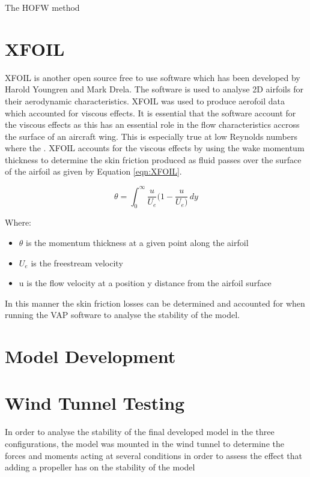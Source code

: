 The HOFW method


\section{XFOIL}
XFOIL is another open source free to use software which has been developed by Harold Youngren and Mark Drela. The software is used to analyse 2D airfoils for their aerodynamic characteristics. XFOIL was used to produce aerofoil data which accounted for viscous effects. It is essential that the software account for the viscous effects as this has an essential role in the flow characteristics accross the surface of an aircraft wing. This is especially true at low Reynolds numbers where the  . XFOIL accounts for the viscous effects by using the wake momentum thickness to determine the skin friction produced as fluid passes over the surface of the airfoil as given by Equation \ref{eqn:XFOIL}. 


\begin{equation}
    \theta = \int_{0}^{\infty} \frac{u}{U_e} ( 1 - \frac{u}{U_e) } \,dy
    \label{eqn:XFOIL}
\end{equation}

Where:
\begin{itemize}
    \item $\theta$ is the momentum thickness at a given point along the airfoil
    \item $U_e$ is the freestream velocity 
    \item u is the flow velocity at a position y distance from the airfoil surface
\end{itemize}

In this manner the skin friction losses can be determined and accounted for when running the VAP software to analyse the stability of the model. 

\section{Model Development}

\section{Wind Tunnel Testing}
In order to analyse the stability of the final developed model in the three configurations, the model was mounted in the wind tunnel to determine the forces and moments acting at several conditions in order to assess the effect that adding a propeller has on the stability of the model


